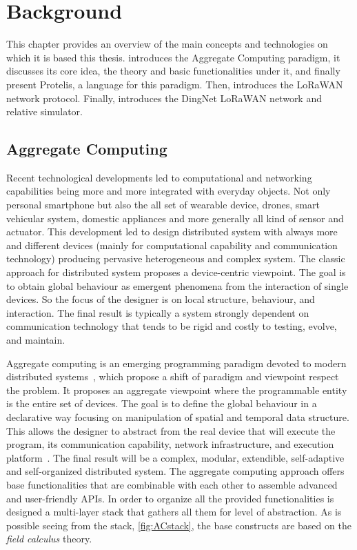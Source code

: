 \chapter{Background}
\label{chap:background}
This chapter provides an overview of the main concepts and technologies on which it is based this thesis.  introduces the Aggregate Computing paradigm, it discusses its core idea, the theory and basic functionalities under it, and finally present Protelis, a language for this paradigm. 
Then,  introduces the LoRaWAN network protocol. 
Finally,  introduces the DingNet LoRaWAN network and relative simulator. 

\section{Aggregate Computing}
\label{sec:AC}
Recent technological developments led to computational and networking capabilities being more and more integrated with everyday objects. 
% 
Not only personal smartphone but also the all set of wearable device, drones, smart vehicular system, domestic appliances and more generally all kind of sensor and actuator.
% 
This development led to design distributed system with always more and different devices (mainly for computational capability and communication technology) producing pervasive heterogeneous and complex system.
% 
The classic approach for distributed system proposes a device-centric viewpoint.
% 
The goal is to obtain global behaviour as emergent phenomena from the interaction of single devices. 
% 
So the focus of the designer is on local structure, behaviour, and interaction. 
% 
The final result is typically a system strongly dependent on communication technology that tends to be rigid and costly to testing, evolve, and maintain.
 
Aggregate computing is an emerging programming paradigm devoted to modern distributed systems~\cite{BealIEEEComputer2015}, which propose a shift of paradigm and viewpoint respect the problem. 
% 
It proposes an aggregate viewpoint where the programmable entity is the entire set of devices.
% 
The goal is to define the global behaviour in a declarative way focusing on manipulation of spatial and temporal data structure. This allows the designer to abstract from the real device that will execute the program, its communication capability, network infrastructure, and execution platform~\cite{ViroliUbiComp2016}. 
% 
The final result will be a complex, modular, extendible, self-adaptive and self-organized distributed system.
% 
The aggregate computing approach offers base functionalities that are combinable with each other to assemble advanced and user-friendly APIs. In order to organize all the provided functionalities is designed a multi-layer stack that gathers all them for level of abstraction. 
As is possible seeing from the stack, \autoref{fig:ACstack}, the base constructs are based on the \textit{field calculus} theory.

